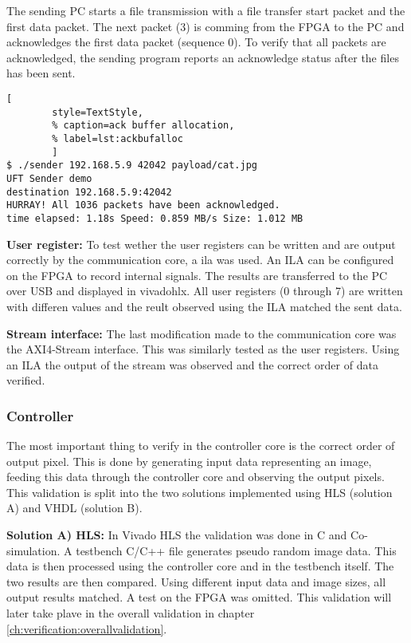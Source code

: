 \vspace{1ex}
The sending PC starts a file transmission with a file transfer start packet and
the first data packet. The next packet (3) is comming from the FPGA to the PC
and acknowledges the first data packet (sequence 0). To verify that all packets
are acknowledged, the sending program reports an acknowledge status after the
files has been sent. 

\begin{minipage}{1\linewidth}
    \begin{lstlisting}[
        style=TextStyle, 
        % caption=ack buffer allocation, 
        % label=lst:ackbufalloc
        ]
$ ./sender 192.168.5.9 42042 payload/cat.jpg
UFT Sender demo
destination 192.168.5.9:42042
HURRAY! All 1036 packets have been acknowledged.
time elapsed: 1.18s Speed: 0.859 MB/s Size: 1.012 MB\end{lstlisting}
\end{minipage}

\vspace{1ex}
\textbf{User register:} To test wether the user registers can be written and are
output correctly by the communication core, a \gls{ila} 
was used. An ILA can be configured on the FPGA to record internal signals. The
results are transferred to the PC over USB and displayed in \gls{vivadohlx}. All
user registers (0 through 7) are written with differen values and the reult
observed using the ILA matched the sent data.

\vspace{1ex}
\textbf{Stream interface:} The last modification made to the communication core
was the AXI4-Stream interface. This was similarly tested as the user registers.
Using an ILA the output of the stream was observed and the correct order of data
verified. 

\subsubsection*{Controller} 
The most important thing to verify in the controller core is the correct order
of output pixel. This is done by generating input data representing an image,
feeding this data through the controller core and observing the output pixels.
This validation is split into the two solutions implemented using HLS (solution
A) and VHDL (solution B).

\vspace{1ex}
\textbf{Solution A) HLS:} In Vivado HLS the validation was done in C and
Co-simulation. A testbench C/C++ file generates pseudo random image data. This
data is then processed using the controller core and in the testbench itself.
The two results are then compared. Using different input data and image sizes,
all output results matched. A test on the FPGA was omitted. This validation will
later take plave in the overall validation in chapter \ref{ch:verification:overallvalidation}.

